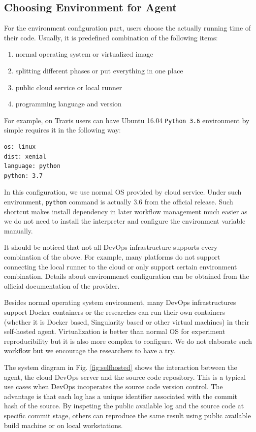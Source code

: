 \documentclass{IEEEcsmag}
\begin{document}
\subsection{Choosing Environment for Agent}
For the environment configuration part, users choose the actually running time of their code. Usually, it is predefined combination of the following items:
\begin{enumerate}
\item normal operating system or virtualized image
\item splitting different phases or put everything in one place
\item public cloud service or local runner
\item programming language and version
\end{enumerate}

For example, on Travis users can have Ubuntu 16.04 \texttt{Python 3.6} environment by simple requires it in the following way:
\begin{lstlisting}
os: linux
dist: xenial
language: python
python: 3.7
\end{lstlisting}

In this configuration, we use normal OS provided by cloud service. Under such environment, \texttt{python} command is actually 3.6 from the official release.
Such shortcut makes install dependency in later workflow management much easier as we do not need to install the interpreter and configure the environment variable manually.

It should be noticed that not all DevOps infrastructure supports every combination of the above. For example, many platforms do not support connecting the local runner to the cloud or only support certain environment combination. Details about environmenet configuration can be obtained from the official documentation of the provider.

Besides normal operating system environment, many DevOps infrastructures support Docker containers or the researches can run their own containers (whether it is Docker based, Singularity based or other virtual machines) in their self-hosted agent. Virtualization is better than normal OS for experiment reproducibility but it is also more complex to configure. We do not elaborate such workflow but we encourage the researchers to have a try.

The system diagram in Fig. \ref{fig:selfhosted} shows the interaction between the agent, the cloud DevOps server and the source code repository. 
This is a typical use cases when DevOps incoperates the source code version control. The advantage is that each log has a unique identifier associated with the commit hash of the source. By inspeting the public available log and the source code at specific commit stage, others can reproduce the same result using public available build machine or on local workstations.
\end{document}
